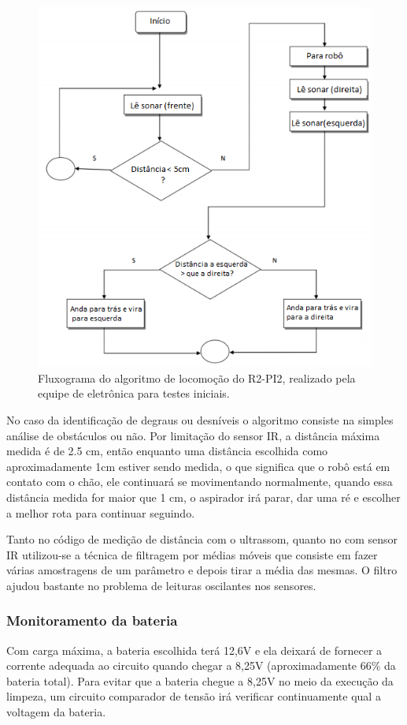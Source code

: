		\begin{figure}[H]
			\centering
			\includegraphics[scale=0.8]{figuras/fluxograma_eletronica.png}
			\caption{Fluxograma do algoritmo de locomoção do R2-PI2, realizado pela equipe de eletrônica para testes iniciais.}
			\label{img:circuito_de_controle_dos_motores}
		\end{figure}

		No caso da identificação de degraus ou desníveis o algoritmo consiste na simples análise de obstáculos ou não. Por limitação do sensor IR, a distância máxima medida é de 2.5 cm, então enquanto uma distância escolhida como aproximadamente 1cm estiver sendo medida, o que significa que o robô está em contato com o chão, ele continuará se movimentando normalmente, quando essa distância medida for maior que 1 cm, o aspirador irá parar, dar uma ré e escolher a melhor rota para continuar seguindo.

		Tanto no código de medição de distância com o ultrassom, quanto no com sensor IR utilizou-se a técnica de filtragem por médias móveis que consiste em fazer várias amostragens de um parâmetro e depois tirar a média das mesmas. O filtro ajudou bastante no problema de leituras oscilantes nos sensores. 

		\subsubsection{Monitoramento da bateria}
		\label{sub:Monitoramento_da_bateria}
		Com carga máxima, a bateria escolhida terá 12,6V e ela deixará de fornecer a corrente adequada ao circuito quando chegar a 8,25V (aproximadamente 66\% da bateria total). Para evitar que a bateria chegue a 8,25V no meio da execução da limpeza, um circuito comparador de tensão irá verificar continuamente qual a voltagem da bateria.

